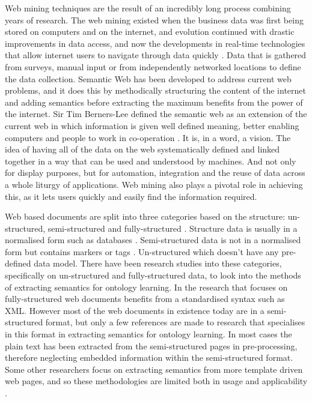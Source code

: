 Web mining techniques are the result of an incredibly long process combining years of research. The web mining existed when the business data was first being stored on computers and on the internet, and evolution continued with drastic improvements in data access, and now the developments in real-time technologies that allow internet users to navigate through data quickly \cite{gargi2014dynamic}. Data that is gathered from surveys, manual input or from independently networked locations to define the data collection. Semantic Web has been developed to address current web problems, and it does this by methodically structuring the content of the internet and adding semantics before extracting the maximum benefits from the power of the internet. Sir Tim Berners-Lee defined the semantic web as an extension of the current web in which information is given well defined meaning, better enabling computers and people to work in co-operation \cite{berners2001semantic}. It is, in a word, a vision. The idea of having all of the data on the web systematically defined and linked together in a way that can be used and understood by machines. And not only for display purposes, but for automation, integration and the reuse of data across a whole liturgy of applications. Web mining also plays a pivotal role in achieving this, as it lets users quickly and easily find the information required.

Web based documents are split into three categories based on the structure: un-structured, semi-structured and fully-structured \cite{kim2015dynamic}. Structure data is usually in a normalised form such as databases \cite{park2014crowdfill}. Semi-structured data is not in a normalised form but contains markers or tags \cite{mansmann2014discovering}. Un-structured which doesn't have any pre-defined data model. There have been research studies into these categories, specifically on un-structured and fully-structured data, to look into the methods of  extracting semantics for ontology learning. In the research that focuses on fully-structured web documents benefits from a standardised syntax such as XML. However most of the web documents in existence today are in a semi-structured format, but only a few references are made to research that specialises in this format in extracting semantics for ontology learning. In most cases the plain text has been extracted from the semi-structured pages in pre-processing, therefore neglecting embedded information within the semi-structured format. Some other researchers focus on extracting semantics from more template driven web pages, and so these methodologies are limited both in usage and applicability \cite{liu2007web}.

